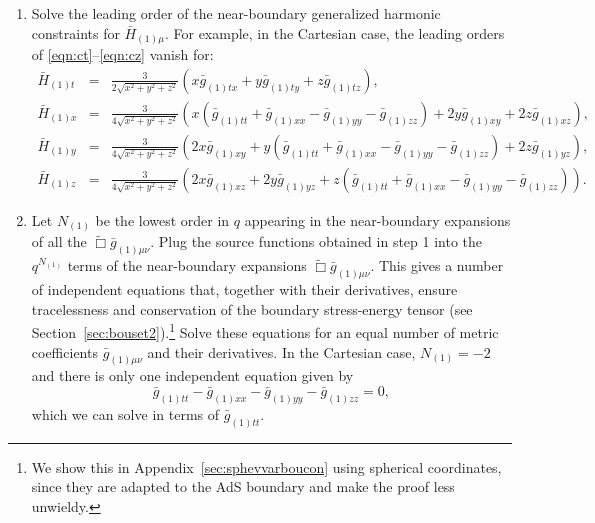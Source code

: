 \documentclass[a4paper,11pt]{article}
\numberwithin{equation}{section}
\begin{document}
\begin{enumerate}
\item Solve the leading order of the near-boundary generalized harmonic constraints for $\bar{H}_{(1)\mu}$.
For example, in the Cartesian case, the leading orders of \eqref{eqn:ct}--\eqref{eqn:cz} vanish for:
\begin{eqnarray}\label{eqn:target_gauge_txyz_step1}
\bar{H}_{(1)t}&=&\frac{3}{2\sqrt{x^2+y^2+z^2}}(x \bar{g}_{(1)tx}+y\bar{g}_{(1)ty}+z\bar{g}_{(1)tz}), \\
\bar{H}_{(1)x}&=&\frac{3}{4\sqrt{x^2+y^2+z^2}}(x(\bar{g}_{(1)tt}+ \bar{g}_{(1)xx}-\bar{g}_{(1)yy}-\bar{g}_{(1)zz})+2y \bar{g}_{(1)xy}+2z \bar{g}_{(1)xz}), \nonumber \\
\bar{H}_{(1)y}&=&\frac{3}{4\sqrt{x^2+y^2+z^2}}(2x \bar{g}_{(1)xy}+y(\bar{g}_{(1)tt}+ \bar{g}_{(1)xx}-\bar{g}_{(1)yy}-\bar{g}_{(1)zz})+2z \bar{g}_{(1)yz}), \nonumber \\
\bar{H}_{(1)z}&=&\frac{3}{4\sqrt{x^2+y^2+z^2}}(2x \bar{g}_{(1)xz}+2y \bar{g}_{(1)yz}+z(\bar{g}_{(1)tt}+ \bar{g}_{(1)xx}-\bar{g}_{(1)yy}-\bar{g}_{(1)zz})). \nonumber 
\end{eqnarray}

\item Let $N_{(1)}$ be the lowest order in $q$ appearing in the near-boundary expansions of all the $\tilde{\Box}\bar{g}_{(1)\mu\nu}$. Plug the source functions obtained in step 1 into the $q^{N_{(1)}}$ terms of the near-boundary expansions $\tilde{\Box}\bar{g}_{(1)\mu\nu}$.
This gives a number of independent equations that, together with their derivatives, ensure tracelessness and conservation of the boundary stress-energy tensor (see Section~\ref{sec:bouset2}).\footnote{We show this in Appendix~\ref{sec:sphevvarboucon} using spherical coordinates, since they are adapted to the AdS boundary and make the proof less unwieldy.}
Solve these equations for an equal number of metric coefficients $\bar g_{(1)\mu\nu}$ and their derivatives.
In the Cartesian case, $N_{(1)}=-2$ and there is only one independent equation given by
\begin{equation}
\label{eq:cart_tracelessness}
\bar{g}_{(1)tt}-\bar{g}_{(1)xx}-\bar{g}_{(1)yy}-\bar{g}_{(1)zz}=0,
\end{equation}
which we can solve in terms of $\bar g_{(1)tt}$.


\end{enumerate}
\end{document}
